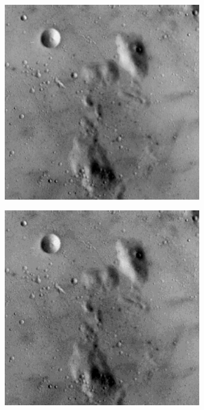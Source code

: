 \begin{figure}
\begin{subfigure}[b]{.23\textwidth}
  \caption{}
  \label{fig:test-images-moonsurface-truncate1}
\end{subfigure}
\begin{subfigure}[b]{.23\textwidth}
  \centering
  \includegraphics[width=0.95\textwidth]{figures/test-images/truncate2/moonsurface}
  \caption{}
  \label{fig:test-images-moonsurface-truncate2}
\end{subfigure}
\begin{subfigure}[b]{.23\textwidth}
  \centering
  \includegraphics[width=0.95\textwidth]{figures/test-images/truncate4/moonsurface}
  \caption{}
  \label{fig:test-images-moonsurface-truncate4}
\end{subfigure}


\end{figure}
